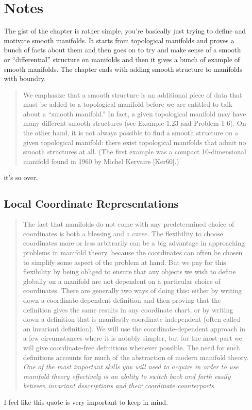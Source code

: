 \documentclass{pset}
\begin{document}
\section{Notes}
The gist of the chapter is rather simple, you're basically just trying to define and motivate smooth manifolds. It starts from topological manifolds and proves a bunch of facts about them and then goes on to try and make sense of a smooth or ``differential'' structure on manifolds and then it gives a bunch of example of smooth manifolds. The chapter ends with adding smooth structure to manifolds with boundry.
\begin{quote}
    We emphasize that a smooth structure is an additional piece of data that must be added to a topological manifold before we are entitled to talk about a “smooth manifold.” In fact, a given topological manifold may have many different smooth structures (see Example 1.23 and Problem 1-6). On the other hand, it is not always possible to find a smooth structure on a given topological manifold: there exist topological manifolds that admit no smooth structures at all. (The first example was a compact 10-dimensional manifold found in 1960 by Michel Kervaire [Ker60].)
\end{quote}
it's so over.
\subsection{Local Coordinate Representations}
\begin{quote}
    The fact that manifolds do not come with any predetermined choice of coordinates is both a blessing and a curse. The flexibility to choose coordinates more or less arbitrarily can be a big advantage in approaching problems in manifold theory, because the coordinates can often be chosen to simplify some aspect of the problem at hand. But we pay for this flexibility by being obliged to ensure that any objects we wish to define globally on a manifold are not dependent on a particular choice of coordinates. There are generally two ways of doing this: either by writing down a coordinate-dependent definition and then proving that the definition gives the same results in any coordinate chart, or by writing down a definition that is manifestly coordinate-independent (often called an invariant definition). We will use the coordinate-dependent approach in a few circumstances where it is notably simpler, but for the most part we will give coordinate-free definitions whenever possible. The need for such definitions accounts for much of the abstraction of modern manifold theory. \emph{One of the most important skills you will need to acquire in order to use manifold theory effectively is an ability to switch back and forth easily between invariant descriptions and their coordinate counterparts.}
\end{quote}
I feel like this quote is very important to keep in mind.
\end{document}
